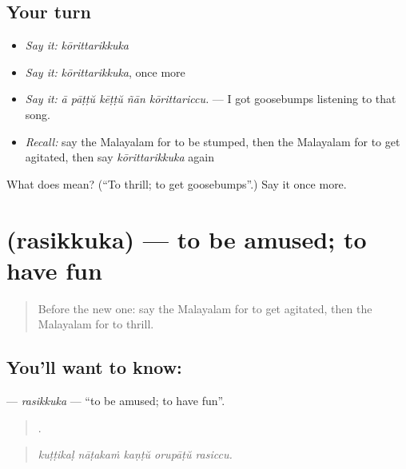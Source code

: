 \subsection*{Your turn}
\begin{itemize}
\raggedright
  \item \emph{Say it:} \emph{kōrittarikkuka}
  \item \emph{Say it:} \emph{kōrittarikkuka}, once more
  \item \emph{Say it:} \emph{ā pāṭṭŭ kēṭṭŭ ñān kōrittariccu.} — I got goosebumps listening to that song.
  \item \emph{Recall:} say the Malayalam for to be stumped, then the Malayalam for to get agitated, then say \emph{kōrittarikkuka} again
\end{itemize}

\begin{tcolorbox}[breakable,colback=teal!4,colframe=teal!35!black,title={Before you move on}]
What does  mean? (\textquotedblleft{}To thrill; to get goosebumps\textquotedblright{}.) Say it once more.
\end{tcolorbox}
\section[\texorpdfstring{\ml{രസിക്കുക} (rasikkuka)}{രസിക്കുക (rasikkuka)}]{ (rasikkuka) — to be amused; to have fun}

\label{lesson:ML-C526-rasikkuka}



\begin{quote}
Before the new one: say the Malayalam for to get agitated, then the Malayalam for to thrill.
\end{quote}

\subsection*{You'll want to know: }
\textbf{} — \emph{rasikkuka} — \textquotedblleft{}to be amused; to have fun\textquotedblright{}.

\begin{quote}
    .
\end{quote}

\begin{quote}
\emph{kuṭṭikaḷ nāṭakaṁ kaṇṭŭ orupāṭŭ rasiccu.}
\end{quote}

